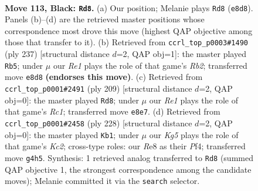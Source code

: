 \documentclass[11pt]{article}
\begin{document}
\begin{figure}[p]\centering
\begin{subfigure}{0.46\textwidth}\centering
\resizebox{\linewidth}{!}{%
\newchessgame
\chessboard[
  setfen={4r3/6K1/8/8/6k1/8/8/8 b - - 11 113},
  showmover=false,
  pgfstyle=straightmove, color=movearrow, markmove={e8-d8}
]}
\caption{}
\end{subfigure}\hfill
\begin{subfigure}{0.46\textwidth}\centering
\resizebox{\linewidth}{!}{%
\newchessgame
\chessboard[
  setfen={8/1r6/3K4/8/k7/8/4Q3/8 b - - 14 119},
  showmover=false,
  pgfstyle=straightmove, color=movearrow, markmove={b7-b5}
]}
\caption{}
\end{subfigure}
\\[4pt]
\begin{subfigure}{0.46\textwidth}\centering
\resizebox{\linewidth}{!}{%
\newchessgame
\chessboard[
  setfen={2r5/4k3/8/8/K7/8/3N4/8 b - - 5 105},
  showmover=false,
  pgfstyle=straightmove, color=movearrow, markmove={c8-d8}
]}
\caption{}
\end{subfigure}\hfill
\begin{subfigure}{0.46\textwidth}\centering
\resizebox{\linewidth}{!}{%
\newchessgame
\chessboard[
  setfen={8/8/8/2k5/5P2/8/2K5/8 w - - 0 115},
  showmover=false,
  pgfstyle=straightmove, color=movearrow, markmove={c2-b1}
]}
\caption{}
\end{subfigure}
\caption{\textbf{Move 113, Black: \texttt{Rd8}.} (a) Our position; Melanie plays \texttt{Rd8} (\texttt{e8d8}). Panels (b)--(d) are the retrieved master positions whose correspondence most drove this move (highest QAP objective among those that transfer to it). (b) Retrieved from \texttt{ccrl\_top\_p0003\#1490} (ply 237) [structural distance $d$=2, QAP obj=1]: the master played \texttt{Rb5}; under $\mu$ our \emph{Re1} plays the role of that game's \emph{Rb2}; transferred move \texttt{e8d8} \textbf{(endorses this move)}. (c) Retrieved from \texttt{ccrl\_top\_p0001\#2491} (ply 209) [structural distance $d$=2, QAP obj=0]: the master played \texttt{Rd8}; under $\mu$ our \emph{Re1} plays the role of that game's \emph{Rc1}; transferred move \texttt{e8e7}. (d) Retrieved from \texttt{ccrl\_top\_p0001\#2458} (ply 228) [structural distance $d$=2, QAP obj=0]: the master played \texttt{Kb1}; under $\mu$ our \emph{Kg5} plays the role of that game's \emph{Kc2}; cross-type roles: our \emph{R}e8 as their \emph{P}f4; transferred move \texttt{g4h5}. Synthesis: 1 retrieved analog transferred to \texttt{Rd8} (summed QAP objective 1, the strongest correspondence among the candidate moves); Melanie committed it via the \texttt{search} selector.}
\label{fig:thought-m225}
\end{figure}
\end{document}

